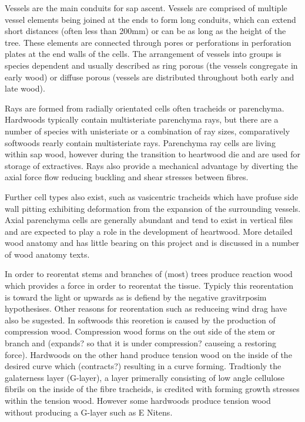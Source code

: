 \documentclass{article}
\begin{document}
Vessels are the main conduits for sap ascent. Vessels are comprised of multiple
vessel elements being joined at the ends to form long conduits, which can extend short
distances (often less than 200mm) or can be as long as the height of the tree.
These elements are connected through pores or perforations in perforation
plates at the end walls of the cells. The arrangement of vessels into groups is
species dependent and usually described as ring porous (the vessels congregate in early wood)
or diffuse porous (vessels are distributed throughout both early and late wood).

Rays are formed from radially orientated cells often tracheids or parenchyma.
Hardwoods typically contain multisteriate parenchyma rays, but there are a
number of species with unisteriate or a combination of ray sizes, comparatively softwoods rearly
contain multisteriate rays. Parenchyma ray cells are living within sap wood,
however during the transition to heartwood die and are used for storage of
extractives. Rays also provide a mechanical advantage by diverting the
axial force flow reducing buckling and shear stresses between fibres.

Further cell types also exist, such as vasicentric tracheids which have profuse
side wall pitting exhibiting deformation from the expansion of the surrounding
vessels. Axial parenchyma cells are generally abundant and tend to exist in
vertical files and are expected to play a role in the development of heartwood.
More detailed wood anatomy and has little bearing on this project and is
discussed in a number of wood anatomy texts.

In order to reorentat stems and branches of (most) trees produce reaction wood
which provides a force in order to reorentat the tissue. Typicly this
reorentation is toward the light or upwards as is defiend by the negative
gravitrposim hypothesises. Other reasons for reorentation such as reduceing wind
drag have also be sugested. In softwoods this reoretion is caused by the
production of compression wood. Compression wood forms on the out side of the
stem or branch and (expands? so that it is under compression? causeing a
restoring force). Hardwoods on the other hand produce tension wood on the inside
of the desired curve which (contracts?) resulting in a curve forming.
Tradtionly the galaterness layer (G-layer), a layer primerally consisting of low
angle cellulose fibrils on the inside of the fibre tracheids, is credited with forming growth
stresses within the tension wood. However some hardwoods produce tension wood
without producing a G-layer such as E Nitens.
\end{document}

